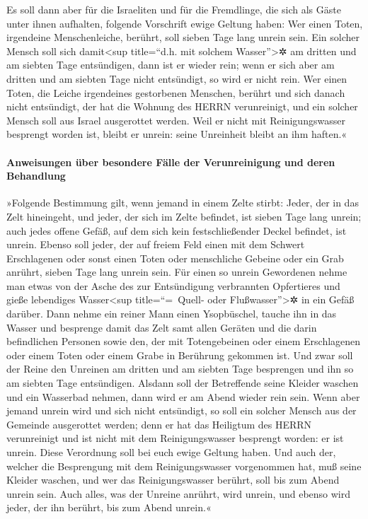 Es soll dann aber für die Israeliten und für die Fremdlinge, die sich
als Gäste unter ihnen aufhalten, folgende Vorschrift ewige Geltung
haben: Wer einen Toten, irgendeine Menschenleiche,
berührt, soll sieben Tage lang unrein sein. Ein solcher
Mensch soll sich damit\textless sup title=``d.h. mit solchem
Wasser''\textgreater✲ am dritten und am siebten Tage entsündigen, dann
ist er wieder rein; wenn er sich aber am dritten und am siebten Tage
nicht entsündigt, so wird er nicht rein. Wer einen Toten,
die Leiche irgendeines gestorbenen Menschen, berührt und sich danach
nicht entsündigt, der hat die Wohnung des HERRN verunreinigt, und ein
solcher Mensch soll aus Israel ausgerottet werden. Weil er nicht mit
Reinigungswasser besprengt worden ist, bleibt er unrein: seine
Unreinheit bleibt an ihm haften.«

\hypertarget{anweisungen-uxfcber-besondere-fuxe4lle-der-verunreinigung-und-deren-behandlung}{%
\paragraph{Anweisungen über besondere Fälle der Verunreinigung und deren
Behandlung}\label{anweisungen-uxfcber-besondere-fuxe4lle-der-verunreinigung-und-deren-behandlung}}

»Folgende Bestimmung gilt, wenn jemand in einem Zelte
stirbt: Jeder, der in das Zelt hineingeht, und jeder, der sich im Zelte
befindet, ist sieben Tage lang unrein; auch jedes offene
Gefäß, auf dem sich kein festschließender Deckel befindet, ist unrein.
Ebenso soll jeder, der auf freiem Feld einen mit dem
Schwert Erschlagenen oder sonst einen Toten oder menschliche Gebeine
oder ein Grab anrührt, sieben Tage lang unrein sein. Für
einen so unrein Gewordenen nehme man etwas von der Asche des zur
Entsündigung verbrannten Opfertieres und gieße lebendiges
Wasser\textless sup title=``=~Quell- oder Flußwasser''\textgreater✲ in
ein Gefäß darüber. Dann nehme ein reiner Mann einen
Ysopbüschel, tauche ihn in das Wasser und besprenge damit das Zelt samt
allen Geräten und die darin befindlichen Personen sowie den, der mit
Totengebeinen oder einem Erschlagenen oder einem Toten oder einem Grabe
in Berührung gekommen ist. Und zwar soll der Reine den
Unreinen am dritten und am siebten Tage besprengen und ihn so am siebten
Tage entsündigen. Alsdann soll der Betreffende seine Kleider waschen und
ein Wasserbad nehmen, dann wird er am Abend wieder rein sein.
Wenn aber jemand unrein wird und sich nicht entsündigt,
so soll ein solcher Mensch aus der Gemeinde ausgerottet werden; denn er
hat das Heiligtum des HERRN verunreinigt und ist nicht mit dem
Reinigungswasser besprengt worden: er ist unrein. Diese
Verordnung soll bei euch ewige Geltung haben. Und auch der, welcher die
Besprengung mit dem Reinigungswasser vorgenommen hat, muß seine Kleider
waschen, und wer das Reinigungswasser berührt, soll bis zum Abend unrein
sein. Auch alles, was der Unreine anrührt, wird unrein,
und ebenso wird jeder, der ihn berührt, bis zum Abend unrein.«

